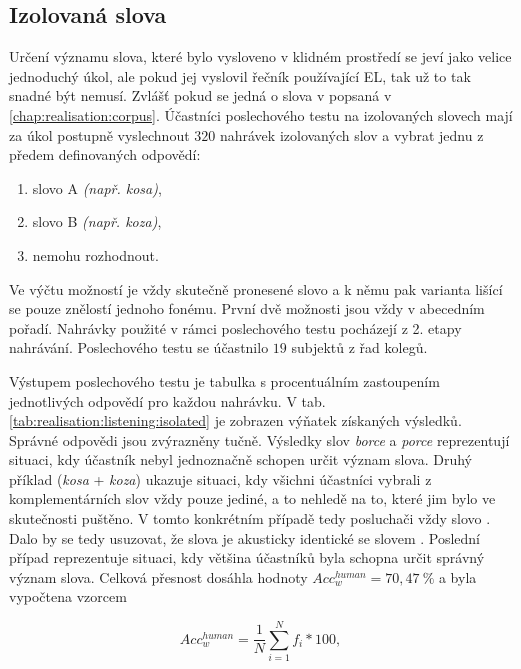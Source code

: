 \subsection{Izolovaná slova}
\label{chap:realisation:listening:isolated}

Určení významu slova, které bylo vysloveno v klidném prostředí se jeví jako velice jednoduchý úkol, ale pokud jej vyslovil řečník používající EL, tak už to tak snadné být nemusí. Zvlášť pokud se jedná o slova v popsaná v \ref{chap:realisation:corpus}. Účastníci poslechového testu na izolovaných slovech mají za úkol postupně vyslechnout $320$ nahrávek izolovaných slov a vybrat jednu z předem definovaných odpovědí:

\begin{enumerate}[label=\alph*)]
  \item slovo A \textit{(např. kosa)},
  \item slovo B \textit{(např. koza)},
  \item nemohu rozhodnout.
\end{enumerate}

\noindent Ve výčtu možností je vždy skutečně pronesené slovo a k němu pak varianta lišící se pouze znělostí jednoho fonému. První dvě možnosti jsou vždy v abecedním pořadí. Nahrávky použité v rámci poslechového testu pocházejí z 2. etapy nahrávání. Poslechového testu se účastnilo $19$ subjektů z řad kolegů.

Výstupem poslechového testu je tabulka s procentuálním zastoupením jednotlivých odpovědí pro každou nahrávku. V tab. \ref{tab:realisation:listening:isolated} je zobrazen výňatek získaných výsledků. Správné odpovědi jsou zvýrazněny tučně. Výsledky slov \textit{borce} a \textit{porce} reprezentují situaci, kdy účastník nebyl jednoznačně schopen určit význam slova. Druhý příklad (\textit{kosa} + \textit{koza}) ukazuje situaci, kdy všichni účastníci vybrali z komplementárních slov vždy pouze jediné, a to nehledě na to, které jim bylo ve skutečnosti puštěno. V tomto konkrétním případě tedy posluchači vždy  slovo . Dalo by se tedy usuzovat, že slova  je akusticky identické se slovem . Poslední případ reprezentuje situaci, kdy většina účastníků byla schopna určit správný význam slova. Celková přesnost dosáhla hodnoty $Acc_w^{human} = 70,47\ \%$ a byla vypočtena vzorcem

\begin{equation}
  Acc_w^{human} = \frac{1}{N} \sum_{i=1}^{N} f_i * 100,
  \label{eq:realisation:accuracy:human}
\end{equation}

